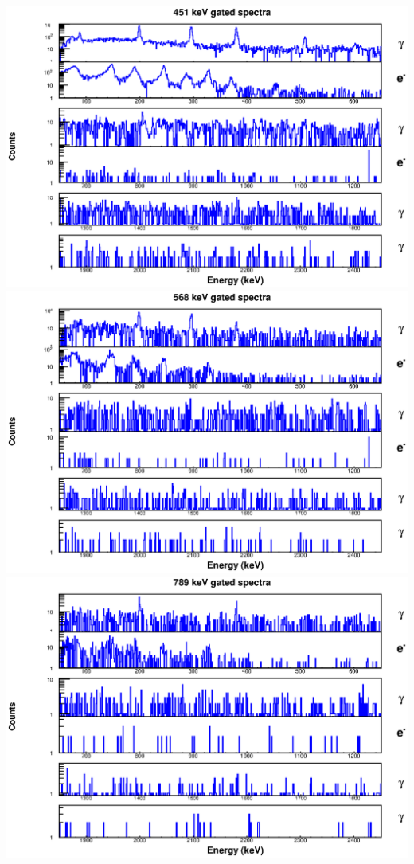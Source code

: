 \includegraphics[scale=0.8]{156Gd_Appendix/451_combined.eps}
\includegraphics[scale=0.8]{156Gd_Appendix/568_combined.eps}
\includegraphics[scale=0.8]{156Gd_Appendix/789_combined.eps}
